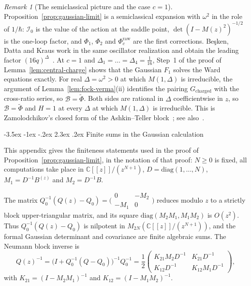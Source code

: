 \documentclass[twoside,10pt]{article}
\makeatletter
\numberwithin{equation}{section}
\theoremstyle{slbody}
\theoremstyle{definition}
\theoremstyle{remark}
\newtheorem*{remark*}{Remark}
\renewcommand{\section}{%
  \@startsection{section}{1}{\z@}%
    {-3.5ex \@plus -1ex \@minus -.2ex}%
    {2.3ex \@plus .2ex}%
    {\normalfont\large\bfseries}}
\makeatother
\begin{document}
\begin{remark*}[The semiclassical picture and the case \(c=1\)]
Proposition~\ref{prop:gaussian-limit} is a semiclassical expansion with
\(\omega^2\) in the role of \(1/\hbar\): \(\mathcal I_0\) is the value of the
action at the saddle point, \(\det(I-M(z)^2)^{-1/2}\) is the one-loop factor,
and \(\Phi_1\), \(\Phi_2\) and \(\Phi_c^{\mathrm{raw}}\) are the first
corrections.  Be\c{s}ken, Datta and Kraus work in the same oscillator
realization and obtain the leading factor
\((16q)^\Delta\)~\cite[\S4.3]{BeskenDattaKraus2019}.  At \(c=1\) and
\(\Delta_1=\dots=\Delta_4=\frac1{16}\), Step~1 of the proof of
Lemma~\ref{lem:central-charge} shows that the Gaussian \(F_1\) solves the Ward
equations exactly.  For real \(\Delta=\omega^2>0\) at which \(M(1,\Delta)\) is
irreducible, the argument of Lemma~\ref{lem:fock-verma}(ii) identifies the
pairing \(G_{\mathrm{charged}}\) with the cross-ratio series, so
\(\mathcal B=\widetilde\Phi\).  Both sides are rational in \(\Delta\)
coefficientwise in \(z\), so \(\mathcal B=\widetilde\Phi\) and \(H=1\) at every
\(\Delta\) at which \(M(1,\Delta)\) is irreducible.  This is Zamolodchikov's closed
form of the Ashkin--Teller block~\cite[(2.28)]{Zamolodchikov1986}; see
also~\cite[(2.13)]{IorgovLisovyyTykhyy2013}.
\end{remark*}

\appendix
\section{Finite sums in the Gaussian calculation}\label{app:gaussian}

This appendix gives the finiteness statements used in the proof of
Proposition~\ref{prop:gaussian-limit}, in the notation of that proof: \(N\geq0\)
is fixed, all computations take place in \(\mathbb C[[z]]/(z^{N+1})\),
\(D=\mathrm{diag}(1,\dots,N)\), \(M_1=D^{-1}B^{(z)}\) and \(M_2=D^{-1}B\).

The matrix
\(Q_0^{-1}(Q(z)-Q_0)=\bigl(\begin{smallmatrix}0&-M_2\\-M_1&0\end{smallmatrix}\bigr)\)
reduces modulo \(z\) to a strictly block upper-triangular matrix, and its square
\(\mathrm{diag}(M_2M_1,M_1M_2)\) is \(O(z^2)\).  Thus
\(Q_0^{-1}(Q(z)-Q_0)\) is nilpotent in \(M_{2N}(\mathbb C[[z]]/(z^{N+1}))\),
and the formal Gaussian determinant and covariance are finite algebraic sums.
The Neumann block inverse is
\[
 Q(z)^{-1}
 =\bigl(I+Q_0^{-1}(Q-Q_0)\bigr)^{-1}Q_0^{-1}
 =\frac12\begin{pmatrix}K_{21}M_2D^{-1}&K_{21}D^{-1}\\K_{12}D^{-1}&K_{12}M_1D^{-1}\end{pmatrix},
\]
with \(K_{21}=(I-M_2M_1)^{-1}\) and \(K_{12}=(I-M_1M_2)^{-1}\).
\end{document}
